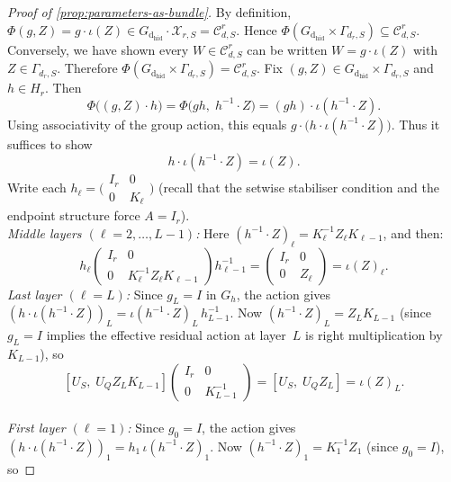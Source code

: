 \documentclass{article}
\newcommand{\dhid}{\operatorname{d_{hid}}}
\theoremstyle{definition}
\begin{document}
\begin{proof}[Proof of \ref{prop:parameters-as-bundle}]\label{proof:parameters-as-bundle}
    By definition, $\Phi(g, Z) = g \cdot \iota(Z) \in G_{\dhid} \cdot \mathcal{X}_{r,S} = \mathcal{C}^r_{d,S}$.  Hence $\Phi(G_{\dhid} \times \Gamma_{d_r,S}) \subseteq \mathcal{C}^r_{d,S}$.  Conversely, we have shown every $W \in \mathcal{C}^r_{d,S}$ can be written $W = g \cdot \iota(Z)$ with $Z \in \Gamma_{d_r,S}$.  Therefore $\Phi(G_{\dhid} \times \Gamma_{d_r,S}) = \mathcal{C}^r_{d,S}$.
Fix $(g, Z) \in G_{\dhid} \times \Gamma_{d_r,S}$ and $h \in H_{r}$.  Then
\[
\Phi\bigl((g, Z) \cdot h\bigr) = \Phi\bigl(gh,\; h^{-1} \cdot Z\bigr)
= (gh) \cdot \iota(h^{-1} \cdot Z).
\]
Using associativity of the group action, this equals $g \cdot \bigl(h \cdot \iota(h^{-1} \cdot Z)\bigr)$.  Thus it suffices to show
\begin{equation}\tag{$\star$}
h \cdot \iota(h^{-1} \cdot Z) = \iota(Z).
\end{equation}
Write each $h_\ell = \bigl(\begin{smallmatrix} I_r & 0 \\ 0 & K_\ell \end{smallmatrix}\bigr)$ (recall that the setwise stabiliser condition and the endpoint structure force $A = I_r$).
\noindent
\\
\emph{Middle layers $(\ell = 2, \dots, L{-}1)$:}  Here $(h^{-1} \cdot Z)_\ell = K_\ell^{-1} Z_\ell K_{\ell-1}$, and then:
\[
h_\ell \begin{pmatrix} I_r & 0 \\ 0 & K_\ell^{-1} Z_\ell K_{\ell-1} \end{pmatrix} h_{\ell-1}^{-1}
= \begin{pmatrix} I_r & 0 \\ 0 & Z_\ell \end{pmatrix} = \iota(Z)_\ell.
\]
\noindent
\emph{Last layer $(\ell = L)$:}  Since $g_L = I$ in $G_h$, the action gives $(h \cdot \iota(h^{-1} \cdot Z))_L = \iota(h^{-1} \cdot Z)_L \, h_{L-1}^{-1}$.  Now $(h^{-1} \cdot Z)_L = Z_L K_{L-1}$ (since $g_L = I$ implies the effective residual action at layer~$L$ is right multiplication by $K_{L-1}$), so
\[
[U_S,\; U_Q Z_L K_{L-1}]
\begin{pmatrix} I_r & 0 \\ 0 & K_{L-1}^{-1} \end{pmatrix}
= [U_S,\; U_Q Z_L] = \iota(Z)_L.
\]
\\
\noindent
\emph{First layer $(\ell = 1)$:}  Since $g_0 = I$, the action gives $(h \cdot \iota(h^{-1} \cdot Z))_1 = h_1 \, \iota(h^{-1} \cdot Z)_1$.  Now $(h^{-1} \cdot Z)_1 = K_1^{-1} Z_1$ (since $g_0 = I$), so

\end{proof}
\end{document}

